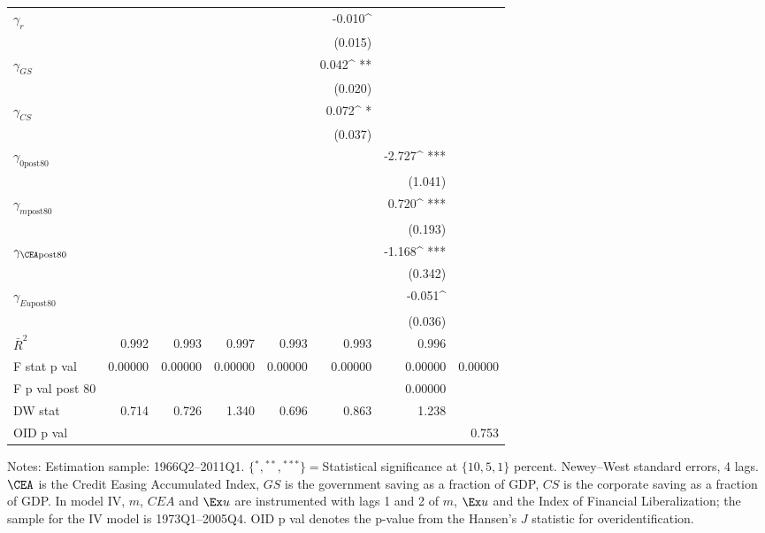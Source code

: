 \begin{table}
\begin{center}
\begin{tabular}{@{}ld{6}d{6}d{6}d{6}d{6}d{6}d{6}@{}}
 $\gamma_{r}$  &   & & & & -0.010^{ }  & & \\
 &   &  & & & (0.015)  & & \\
 $\gamma_{GS}$  &   & & & & 0.042^{ **}  & & \\
 &   &  & & & (0.020)  &  & \\
 $\gamma_{CS}$  &   & & & &0.072^{ *}  & & \\
 &   &  & & & (0.037)  & & \\
 $\gamma_{\text{0post80}}$  &   & & & & &-2.727^{ ***}  &  \\
 &   &  & & & & (1.041)   & \\
 $\gamma_{m\text{post80}}$  &   & & & & &0.720^{ ***}  &  \\
 &   &  & &  & &(0.193)  &  \\
 $\gamma_{\CEA\text{post80}}$  &   & & & & &-1.168^{ ***}  & \\
 &   &  & & & &(0.342)  & \\
 $\gamma_{Eu\text{post80}}$  &   & & & & &-0.051^{ }  &  \\
 &   &  & &  & & (0.036)  &  \\
\midrule
 $\bar{R}^2$  & 0.992  & 0.993  & 0.997  & 0.993  & 0.993  & 0.996  & \\
 F stat p val  & 0.00000  & 0.00000  & 0.00000  & 0.00000  & 0.00000  & 0.00000  & 0.00000\\
 F p val post 80 &  & & & & & 0.00000  &  \\
DW stat  & 0.714  & 0.726  & 1.340  & 0.696  & 0.863  & 1.238 & \\
OID p val &  & & & &  & & 0.753\\
\bottomrule
\end{tabular}
\end{center}
 {\footnotesize Notes: Estimation sample: 1966Q2--2011Q1. $\{{}^*,{}^{**},{}^{***}\}={}$Statistical significance at $\{10,5,1\}$ percent. Newey--West standard errors, 4 lags. $\CEA$ is the Credit Easing Accumulated Index, $GS$ is the government saving as a fraction of GDP, $CS$ is the corporate saving as a fraction of GDP. In model IV, $m$, $CEA$ and $\Ex u$ are instrumented with lags 1 and 2 of $m$, $\Ex u$ and the \cite{abiadEtAl_FinReforms} Index of Financial Liberalization; the sample for the IV model is 1973Q1--2005Q4. OID p val denotes the p-value from the Hansen's $J$ statistic for overidentification.}
\end{table}
